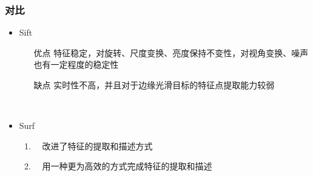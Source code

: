 \documentclass[presentation,aspectratio=1610]{beamer}
\begin{document}
\begin{frame}
	\frametitle{对比}
	\begin{itemize}
		\item Sift
	\begin{enumerate}
		\item[优点] 特征稳定，对旋转、尺度变换、亮度保持不变性，对视角变换、噪声也有一定程度的稳定性
		\item[缺点] 实时性不高，并且对于边缘光滑目标的特征点提取能力较弱
	\end{enumerate}　\vspace{.5cm}\pause

		\item Surf
			\begin{enumerate}
			\item　改进了特征的提取和描述方式
			\item　用一种更为高效的方式完成特征的提取和描述
		\end{enumerate}
		
	\end{itemize}
\end{frame}
\end{document}
